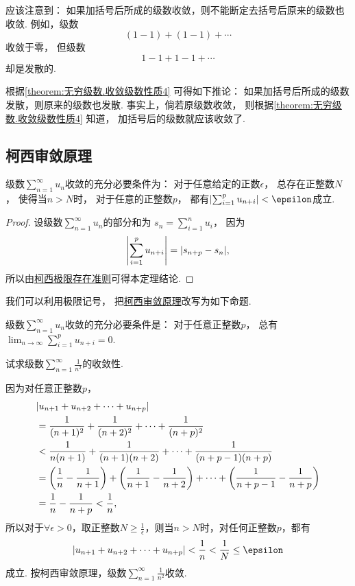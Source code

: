 应该注意到：
如果加括号后所成的级数收敛，则不能断定去括号后原来的级数也收敛.
例如，级数\[
	(1-1)+(1-1)+\dotsb
\]收敛于零，
但级数\[
	1-1+1-1+\dotsb
\]却是发散的.

根据\cref{theorem:无穷级数.收敛级数性质4} 可得如下推论：
{\color{red}如果加括号后所成的级数发散，则原来的级数也发散.}
事实上，倘若原级数收敛，
则根据\cref{theorem:无穷级数.收敛级数性质4} 知道，
加括号后的级数就应该收敛了.

\subsection{柯西审敛原理}
\begin{theorem}[柯西审敛原理]\label{theorem:无穷级数.级数的柯西审敛原理}
级数\(\sum_{n=1}^\infty u_n\)收敛的充分必要条件为：
对于任意给定的正数\(\epsilon\)，
总存在正整数\(N\)，
使得当\(n>N\)时，
对于任意的正整数\(p\)，
都有\(\abs{ \sum_{i=1}^p u_{n+i} }
< \epsilon\)成立.
\begin{proof}
设级数\(\sum_{n=1}^\infty u_n\)的部分和为
\(s_n = \sum_{i=1}^n u_i\)，
因为\[
	\abs{ \sum_{i=1}^p u_{n+i} }
	= \abs{s_{n+p}-s_n},
\]
所以由\hyperref[theorem:极限.数列的柯西极限存在准则]{柯西极限存在准则}可得本定理结论.
\end{proof}
\end{theorem}

我们可以利用极限记号，
把\hyperref[theorem:无穷级数.级数的柯西审敛原理]{柯西审敛原理}改写为如下命题.
\begin{proposition}
级数\(\sum_{n=1}^\infty u_n\)收敛的充分必要条件是：
对于任意正整数\(p\)，
总有\(\lim_{n\to\infty} \sum_{i=1}^p u_{n+i} = 0\).
\end{proposition}

\begin{example}
试求级数\(\sum_{n=1}^\infty \frac{1}{n^2}\)的收敛性.
\begin{solution}
因为对任意正整数\(p\)，\begin{align*}
&\abs{u_{n+1}+u_{n+2}+\dotsb+u_{n+p}} \\
&=\frac{1}{(n+1)^2}+\frac{1}{(n+2)^2}+\dotsb+\frac{1}{(n+p)^2} \\
&<\frac{1}{n(n+1)}+\frac{1}{(n+1)(n+2)}+\dotsb+\frac{1}{(n+p-1)(n+p)} \\
&=\left(\frac{1}{n}-\frac{1}{n+1}\right)+\left(\frac{1}{n+1}-\frac{1}{n+2}\right)+\dotsb+\left(\frac{1}{n+p-1}-\frac{1}{n+p}\right) \\
&=\frac{1}{n}-\frac{1}{n+p} < \frac{1}{n},
\end{align*}
所以对于\(\forall \epsilon > 0\)，取正整数\(N \geq \frac{1}{\epsilon}\)，则当\(n > N\)时，对任何正整数\(p\)，都有\[
\abs{u_{n+1}+u_{n+2}+\dotsb+u_{n+p}}
< \frac{1}{n}
< \frac{1}{N}
\leq \epsilon
\]成立.
按柯西审敛原理，级数\(\sum_{n=1}^\infty \frac{1}{n^2}\)收敛.
\end{solution}
\end{example}
